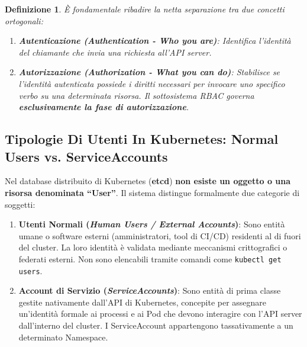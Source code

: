 \documentclass[11pt, a4paper]{article}
\newtheorem{theorem}{Definizione}
\begin{document}
\begin{theorem}
È fondamentale ribadire la netta separazione tra due concetti ortogonali:
\begin{enumerate}
    \item \textbf{Autenticazione (\emph{Authentication - Who you are})}: Identifica l'identità del chiamante che invia una richiesta all'API server.
    \item \textbf{Autorizzazione (\emph{Authorization - What you can do})}: Stabilisce se l'identità autenticata possiede i diritti necessari per invocare uno specifico verbo su una determinata risorsa. Il sottosistema RBAC governa \textbf{esclusivamente la fase di autorizzazione}.
\end{enumerate}
\end{theorem}

\subsection{Tipologie Di Utenti In Kubernetes: Normal Users vs. ServiceAccounts}
Nel database distribuito di Kubernetes (\textbf{etcd}) \textbf{non esiste un oggetto o una risorsa denominata ``User''}. Il sistema distingue formalmente due categorie di soggetti:


\begin{enumerate}
    \item \textbf{Utenti Normali (\emph{Human Users / External Accounts})}: Sono entità umane o software esterni (amministratori, tool di CI/CD) residenti al di fuori del cluster. La loro identità è validata mediante meccanismi crittografici o federati esterni. Non sono elencabili tramite comandi come \texttt{kubectl get users}.
    \item \textbf{Account di Servizio (\emph{ServiceAccounts})}: Sono entità di prima classe gestite nativamente dall'API di Kubernetes, concepite per assegnare un'identità formale ai processi e ai Pod che devono interagire con l'API server dall'interno del cluster. I ServiceAccount appartengono tassativamente a un determinato Namespace.
\end{enumerate}
\end{document}
